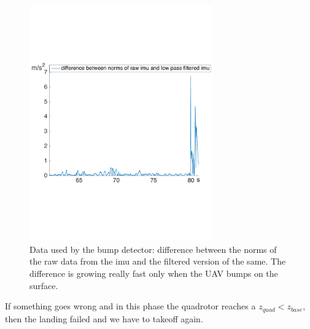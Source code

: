 \begin{figure}[!htbp]
    \centering
    \includegraphics[width=0.7\textwidth]{img/imu_landing.pdf}
    \caption{Data used by the bump detector: difference between the norms of the raw data from the imu and the filtered version of the same. The difference is growing really fast only when the UAV bumps on the surface.}
    \label{fig:imu_landing}
\end{figure}
 
If something goes wrong and in this phase the quadrotor reaches a $z_{quad} < z_{base}$, then the landing failed and we have to takeoff again.
